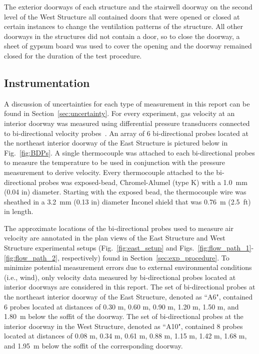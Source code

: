 \documentclass[12pt,oneside]{book}
\begin{document}
The exterior doorways of each structure and the stairwell doorway on the second level of the West Structure all contained doors that were opened or closed at certain instances to change the ventilation patterns of the structure. All other doorways in the structures did not contain a door, so to close the doorway, a sheet of gypsum board was used to cover the opening and the doorway remained closed for the duration of the test procedure.
\FloatBarrier

\subsection{Instrumentation}
\label{sec:instrumentation}
A discussion of uncertainties for each type of measurement in this report can be found in Section~\ref{sec:uncertainty}. For every experiment, gas velocity at an interior doorway was measured using differential pressure transducers connected to bi-directional velocity probes~\cite{McCaffrey:Combustion_and_Flame}. An array of 6 bi-directional probes located at the northeast interior doorway of the East Structure is pictured below in Fig.~\ref{fig:BDPs}. A single thermocouple was attached to each bi-directional probes to measure the temperature to be used in conjunction with the pressure measurement to derive velocity. Every thermocouple attached to the bi-directional probes was exposed-bead, Chromel-Alumel (type K) with a 1.0~mm (0.04 in) diameter. Starting with the exposed bead, the thermocouple wire was sheathed in a 3.2~mm (0.13 in) diameter Inconel shield that was 0.76~m (2.5~ft) in length. 

The approximate locations of the bi-directional probes used to measure air velocity are annotated in the plan views of the East Structure and West Structure experimental setups (Fig.~\ref{fig:east_setup} and Figs.~\ref{fig:flow_path_1}-\ref{fig:flow_path_2}, respectively) found in Section~\ref{sec:exp_procedure}. To minimize potential measurement errors due to external environmental conditions (i.e., wind), only velocity data measured by bi-directional probes located at interior doorways are considered in this report. The set of bi-directional probes at the northeast interior doorway of the East Structure, denoted as ``A6", contained 6 probes located at distances of 0.30 m, 0.60 m, 0.90 m, 1.20 m, 1.50 m, and 1.80~m below the soffit of the doorway. The set of bi-directional probes at the interior doorway in the West Structure, denoted as ``A10", contained 8 probes located at distances of 0.08 m, 0.34 m, 0.61 m, 0.88 m, 1.15 m, 1.42 m, 1.68 m, and 1.95~m below the soffit of the corresponding doorway.
\end{document}
